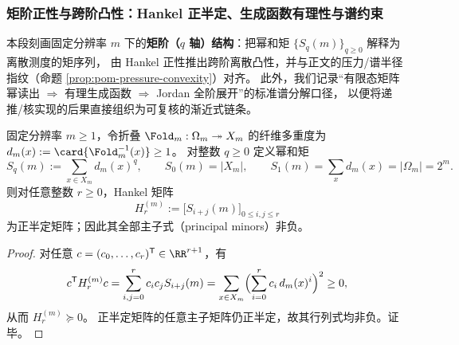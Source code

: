 \subsubsection{矩阶正性与跨阶凸性：Hankel 正半定、生成函数有理性与谱约束}\label{subsubsec:pom-moment-hankel-positivity-crossq}
本段刻画固定分辨率 \(m\) 下的\textbf{矩阶（\(q\) 轴）结构}：把幂和矩 \(\{S_q(m)\}_{q\ge 0}\) 解释为离散测度的矩序列，
由 Hankel 正性推出跨阶离散凸性，并与正文的压力/谱半径指纹（命题 \ref{prop:pom-pressure-convexity}）对齐。
此外，我们记录“有限态矩阵幂读出 \(\Rightarrow\) 有理生成函数 \(\Rightarrow\) Jordan 全阶展开”的标准谱分解口径，
以便将递推/核实现的后果直接组织为可复核的渐近式链条。

\begin{proposition}\label{prop:pom-power-sum-hankel-psd}
固定分辨率 \(m\ge 1\)，令折叠 \(\Fold_m:\Omega_m\twoheadrightarrow X_m\) 的纤维多重度为
\(
d_m(x):=\card{\Fold_m^{-1}(x)}\ge 1
\)。
对整数 \(q\ge 0\) 定义幂和矩
\[
S_q(m):=\sum_{x\in X_m} d_m(x)^q,
\qquad
S_0(m)=|X_m|,
\qquad
S_1(m)=\sum_x d_m(x)=|\Omega_m|=2^m.
\]
则对任意整数 \(r\ge 0\)，Hankel 矩阵
\[
H^{(m)}_r:=\bigl[S_{i+j}(m)\bigr]_{0\le i,j\le r}
\]
为正半定矩阵；因此其全部主子式（principal minors）非负。
\end{proposition}
\begin{proof}
对任意 \(c=(c_0,\dots,c_r)^{\mathsf T}\in\RR^{r+1}\)，有
\[
c^{\mathsf T}H^{(m)}_r c
=\sum_{i,j=0}^{r} c_ic_jS_{i+j}(m)
=\sum_{x\in X_m}\Bigl(\sum_{i=0}^{r}c_i\,d_m(x)^i\Bigr)^2
\ge 0,
\]
从而 \(H^{(m)}_r\succeq 0\)。
正半定矩阵的任意主子矩阵仍正半定，故其行列式均非负。证毕。
\end{proof}

